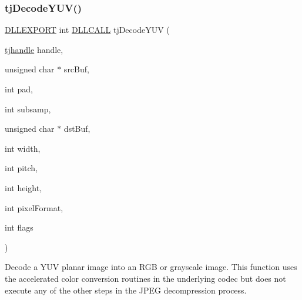 \subsubsection{\texorpdfstring{tj\+Decode\+Y\+U\+V()}{tjDecodeYUV()}}
{\footnotesize\ttfamily \hyperlink{turbojpeg_8h_a808e08638be3cba36e36759e5b150de0}{D\+L\+L\+E\+X\+P\+O\+RT} int \hyperlink{turbojpeg_8h_a54b25836118bfac94a53a7b790f3ccb2}{D\+L\+L\+C\+A\+LL} tj\+Decode\+Y\+UV (\begin{DoxyParamCaption}\item[{\hyperlink{group___turbo_j_p_e_g_ga758d2634ecb4949de7815cba621f5763}{tjhandle}}]{handle,  }\item[{unsigned char $\ast$}]{src\+Buf,  }\item[{int}]{pad,  }\item[{int}]{subsamp,  }\item[{unsigned char $\ast$}]{dst\+Buf,  }\item[{int}]{width,  }\item[{int}]{pitch,  }\item[{int}]{height,  }\item[{int}]{pixel\+Format,  }\item[{int}]{flags }\end{DoxyParamCaption})}

Decode a Y\+UV planar image into an R\+GB or grayscale image. This function uses the accelerated color conversion routines in the underlying codec but does not execute any of the other steps in the J\+P\+EG decompression process.


